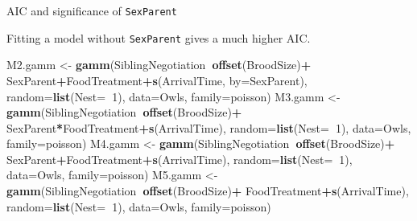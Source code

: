 \documentclass[
  ignorenonframetext,
]{beamer}
\newenvironment{Shaded}{\begin{snugshade}}{\end{snugshade}}
\newcommand{\DataTypeTok}[1]{\textcolor[rgb]{0.13,0.29,0.53}{#1}}
\newcommand{\DecValTok}[1]{\textcolor[rgb]{0.00,0.00,0.81}{#1}}
\newcommand{\KeywordTok}[1]{\textcolor[rgb]{0.13,0.29,0.53}{\textbf{#1}}}
\newcommand{\NormalTok}[1]{#1}
\newcommand{\OperatorTok}[1]{\textcolor[rgb]{0.81,0.36,0.00}{\textbf{#1}}}
\newcommand{\StringTok}[1]{\textcolor[rgb]{0.31,0.60,0.02}{#1}}
\begin{document}
\begin{frame}[fragile]{AIC and significance of \texttt{SexParent}}
\protect\hypertarget{aic-and-significance-of-sexparent}{}

Fitting a model without \texttt{SexParent} gives a much higher AIC.

\scriptsize

\begin{Shaded}
\begin{Highlighting}[]
\NormalTok{M2.gamm <-}\StringTok{ }\KeywordTok{gamm}\NormalTok{(SiblingNegotiation}\OperatorTok{~}\KeywordTok{offset}\NormalTok{(BroodSize)}\OperatorTok{+}
\StringTok{                }\NormalTok{SexParent}\OperatorTok{+}\NormalTok{FoodTreatment}\OperatorTok{+}\KeywordTok{s}\NormalTok{(ArrivalTime, }\DataTypeTok{by=}\NormalTok{SexParent),}
                \DataTypeTok{random=}\KeywordTok{list}\NormalTok{(}\DataTypeTok{Nest=}\OperatorTok{~}\DecValTok{1}\NormalTok{), }\DataTypeTok{data=}\NormalTok{Owls, }\DataTypeTok{family=}\NormalTok{poisson)}
\NormalTok{M3.gamm <-}\StringTok{ }\KeywordTok{gamm}\NormalTok{(SiblingNegotiation}\OperatorTok{~}\KeywordTok{offset}\NormalTok{(BroodSize)}\OperatorTok{+}
\StringTok{                }\NormalTok{SexParent}\OperatorTok{*}\NormalTok{FoodTreatment}\OperatorTok{+}\KeywordTok{s}\NormalTok{(ArrivalTime),}
                \DataTypeTok{random=}\KeywordTok{list}\NormalTok{(}\DataTypeTok{Nest=}\OperatorTok{~}\DecValTok{1}\NormalTok{), }\DataTypeTok{data=}\NormalTok{Owls, }\DataTypeTok{family=}\NormalTok{poisson)}
\NormalTok{M4.gamm <-}\StringTok{ }\KeywordTok{gamm}\NormalTok{(SiblingNegotiation}\OperatorTok{~}\KeywordTok{offset}\NormalTok{(BroodSize)}\OperatorTok{+}
\StringTok{                }\NormalTok{SexParent}\OperatorTok{+}\NormalTok{FoodTreatment}\OperatorTok{+}\KeywordTok{s}\NormalTok{(ArrivalTime),}
                \DataTypeTok{random=}\KeywordTok{list}\NormalTok{(}\DataTypeTok{Nest=}\OperatorTok{~}\DecValTok{1}\NormalTok{), }\DataTypeTok{data=}\NormalTok{Owls, }\DataTypeTok{family=}\NormalTok{poisson)}
\NormalTok{M5.gamm <-}\StringTok{ }\KeywordTok{gamm}\NormalTok{(SiblingNegotiation}\OperatorTok{~}\KeywordTok{offset}\NormalTok{(BroodSize)}\OperatorTok{+}
\StringTok{                }\NormalTok{FoodTreatment}\OperatorTok{+}\KeywordTok{s}\NormalTok{(ArrivalTime),}
                \DataTypeTok{random=}\KeywordTok{list}\NormalTok{(}\DataTypeTok{Nest=}\OperatorTok{~}\DecValTok{1}\NormalTok{), }\DataTypeTok{data=}\NormalTok{Owls, }\DataTypeTok{family=}\NormalTok{poisson)}
\end{Highlighting}
\end{Shaded}


\end{frame}
\end{document}
